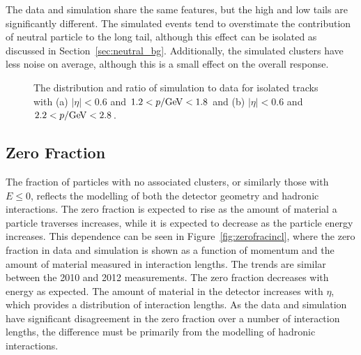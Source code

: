The data and simulation share the same features, but the high and low tails are significantly different.
The simulated events tend to overstimate the contribution of neutral particle to the long tail, although this effect can be isolated as discussed in Section~\ref{sec:neutral_bg}. 
Additionally, the simulated clusters have less noise on average, although this is a small effect on the overall response.

\begin{figure}[htbp]
\centering
{}
\caption{The \ep distribution and ratio of simulation to data for isolated tracks with (a) $|\eta| < 0.6$ and $1.2 < p /\GeV < 1.8$ and (b) $|\eta| < 0.6$ and $2.2 < p /\GeV < 2.8$.}

\label{fig:eoverp}
\end{figure}

\subsection{Zero Fraction}
\label{sec:zero_fraction}

The fraction of particles with no associated clusters, or similarly those with $E \leq 0$, reflects the modelling of both the detector geometry and hadronic interactions.
The zero fraction is expected to rise as the amount of material a particle traverses increases, while it is expected to decrease as the particle energy increases.
This dependence can be seen in Figure~\ref{fig:zerofracincl}, where the zero fraction in data and simulation is shown as a function of momentum and the amount of material measured in interaction lengths.
The trends are similar between the 2010 and 2012 measurements.
The zero fraction decreases with energy as expected.
The amount of material in the detector increases with $\eta$, which provides a distribution of interaction lengths.
As the data and simulation have significant disagreement in the zero fraction over a number of interaction lengths, the difference must be primarily from the modelling of hadronic interactions.

